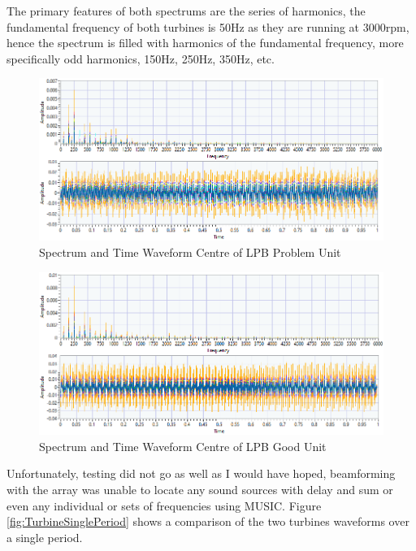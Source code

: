 \documentclass{UoNMCHA}
\numberwithin{equation}{section}
\begin{document}
    The primary features of both spectrums are the series of harmonics, the fundamental frequency of both turbines is 50Hz as they are running at 3000rpm, hence the spectrum is filled with harmonics of the fundamental frequency, more specifically odd harmonics, 150Hz, 250Hz, 350Hz, etc. 

    \begin{figure} [H]
        \centering
        \includegraphics[keepaspectratio, width = \textwidth]{Figures/U5_LPB.png}
        \caption{Spectrum and Time Waveform Centre of LPB Problem Unit}
        \label{fig:U5 Signal}
    \end{figure}

    \begin{figure} [H]
        \centering
        \includegraphics[keepaspectratio, width = \textwidth]{Figures/U6_LPB.png}
        \caption{Spectrum and Time Waveform Centre of LPB Good Unit}
        \label{fig:U6 Signal}
    \end{figure}

    Unfortunately, testing did not go as well as I would have hoped, beamforming with the array was unable to locate any sound sources with delay and sum or even any individual or sets of frequencies using MUSIC. Figure \ref{fig:TurbineSinglePeriod} shows a comparison of the two turbines waveforms over a single period. 
\end{document}
